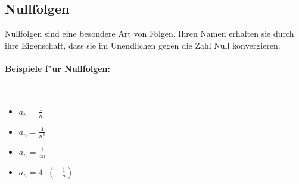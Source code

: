 \subsection{Nullfolgen}
Nullfolgen sind eine besondere Art von Folgen. Ihren Namen erhalten sie durch ihre Eigenschaft, dass sie im Unendlichen gegen die Zahl Null konvergieren.

\paragraph{Beispiele f"ur Nullfolgen:}\hspace{2 cm}\\
\begin{itemize}
\item $ a_n = \frac{1}{n} $
\item $ a_n = \frac{4}{n^3} $
\item $ a_n = \frac{1}{4n}$
\item $ a_n = 4 \cdot \left(-\frac{1}{n}\right)$
\end{itemize}